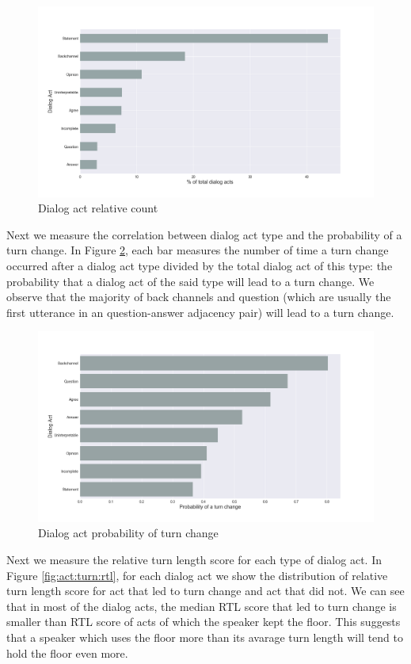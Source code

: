  \begin{figure}[ht!]
 \centering
 \includegraphics[width=\textwidth]{../scikitlearn/figures/f1.png}
 \caption{Dialog act relative count}
 \label{fig:act}
 \end{figure}

Next we measure the correlation between dialog act type and the probability of a turn change.  In Figure \ref{fig:act:turnchange}, each bar measures the number of time a turn change occurred after a dialog act type divided by the total dialog act of this type: the probability that a dialog act of the said type will lead to a turn change. We observe that the majority of back channels and question (which are usually the first utterance in an question-answer adjacency pair) will lead to a turn change.

\begin{figure}[ht!]
\centering
\includegraphics[width=\textwidth]{../scikitlearn/figures/f2.png}
\caption{Dialog act probability of turn change}
\label{fig:act:turnchange}
\end{figure}

Next we measure the relative turn length score for each type of dialog act.
In Figure \ref{fig:act:turn:rtl}, for each dialog act we show the distribution of relative turn length score for act that
led to turn change and act that did not. We can see that in most of the dialog acts,
the median RTL score that led to turn change is smaller than RTL score of acts of which
the speaker kept the floor. This suggests that a speaker which uses the floor more than its
avarage turn length will tend to hold the floor even more.


